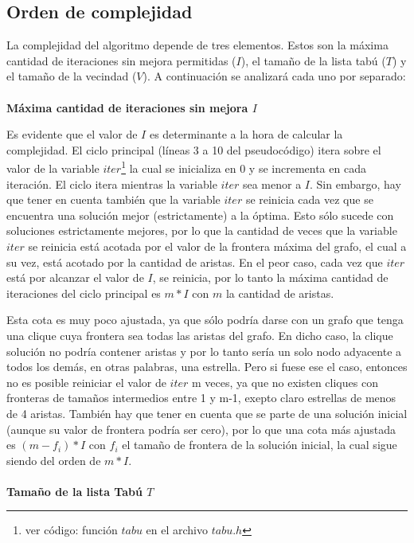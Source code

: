 \subsection{Orden de complejidad}

\par{La complejidad del algoritmo depende de tres elementos. Estos son la
máxima cantidad de iteraciones sin mejora permitidas ($I$), el tamaño de la
lista tabú ($T$) y el tamaño de la vecindad ($V$). A continuación se analizará
cada uno por separado:}
\\\\
\textbf{Máxima cantidad de iteraciones sin mejora $I$}\\

\par{Es evidente que el valor de $I$ es determinante a la hora de calcular la
complejidad. El ciclo principal (líneas 3 a 10 del pseudocódigo) itera sobre
el valor de la variable $iter$\footnote{ver código: función $tabu$ en el
archivo $tabu.h$} la cual se inicializa en $0$ y se incrementa en cada
iteración. El ciclo itera mientras la variable $iter$ sea menor a $I$. Sin
embargo, hay que tener en cuenta también que la variable $iter$ se reinicia
cada vez que se encuentra una solución mejor (estrictamente) a la óptima.
Esto sólo sucede con soluciones estrictamente mejores, por lo que la cantidad
de veces que la variable $iter$ se reinicia está acotada por el valor de la
frontera máxima del grafo, el cual a su vez, está acotado por la cantidad de
aristas. En el peor caso, cada vez que $iter$ está por alcanzar el valor de
$I$, se reinicia, por lo tanto la máxima cantidad de iteraciones del ciclo
principal es $m*I$ con $m$ la cantidad de aristas.}\\

\par{Esta cota es muy poco ajustada, ya que sólo podría darse
con un grafo que tenga una clique cuya frontera sea todas las aristas del
grafo. En dicho caso, la clique solución no podría contener aristas y por lo
tanto sería un solo nodo adyacente a todos los demás, en otras palabras, una
estrella. Pero si fuese ese el caso, entonces no es posible reiniciar el valor
de $iter$ m veces, ya que no existen cliques con fronteras de tamaños
intermedios entre 1 y m-1, exepto claro estrellas de menos de 4 aristas.
También hay que tener en cuenta que se parte de una solución inicial (aunque
su valor de frontera podría ser cero), por lo que una cota más ajustada
es $(m-f_i)*I$ con $f_i$ el tamaño de frontera de la solución inicial, la cual
sigue siendo del orden de $m*I$.}
\\\\
\textbf{Tamaño de la lista Tabú $T$}\\

